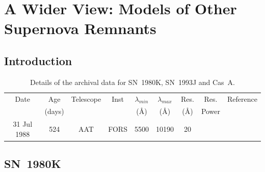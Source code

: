 \chapter{A Wider View: Models of Other Supernova Remnants}\label{chp:chp6}

%
%



\section{Introduction}

\setlength{\tabcolsep}{7pt}
\begin{table}
	\centering
	\caption{Details of the archival data for SN~1980K, SN~1993J and Cas~A.}
	\label{tb:data}
  	\begin{tabular}{@{} ccccccccl @{}}
    	\hline
	Date & Age & Telescope  & Inst & $\lambda_{min}$ & $\lambda_{max}$ & Res. & Res. & Reference \\
	& (days) & & &(\AA) & (\AA)& (\AA) & Power\\
	\hline
31 Jul 1988 & 524 & AAT & FORS & 5500 & 10190 & 20 & & \citet{Spyromilio1991} \\

    \hline
  \end{tabular}
\end{table}


\setlength{\tabcolsep}{12pt}

\section{SN~1980K}


